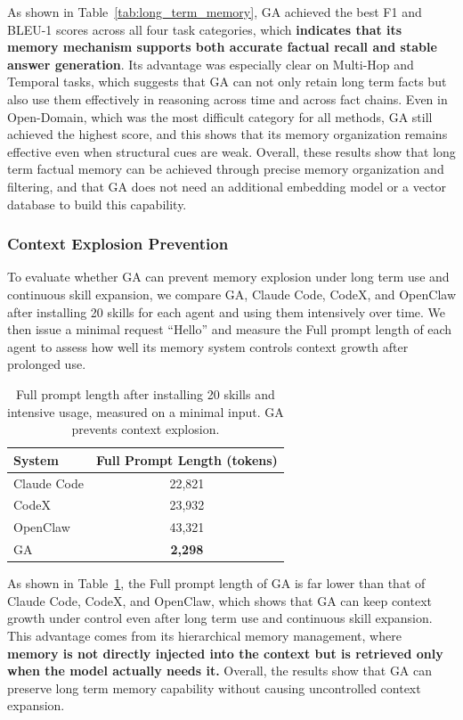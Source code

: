 As shown in Table~\ref{tab:long_term_memory}, GA achieved the best F1 and BLEU-1 scores across all four task categories, which \textbf{indicates that its memory mechanism supports both accurate factual recall and stable answer generation}. 
Its advantage was especially clear on Multi-Hop and Temporal tasks, which suggests that GA can not only retain long term facts but also use them effectively in reasoning across time and across fact chains. 
Even in Open-Domain, which was the most difficult category for all methods, GA still achieved the highest score, and this shows that its memory organization remains effective even when structural cues are weak. 
Overall, these results show that long term factual memory can be achieved through precise memory organization and filtering, and that GA does not need an additional embedding model or a vector database to build this capability.


\subsubsection{Context Explosion Prevention}
\label{sec:exp_context_explosion}
To evaluate whether GA can prevent memory explosion under long term use and continuous skill expansion, we compare GA, Claude Code, CodeX, and OpenClaw after installing 20 skills for each agent and using them intensively over time. 
We then issue a minimal request ``Hello'' and measure the Full prompt length of each agent to assess how well its memory system controls context growth after prolonged use.

\begin{table}[t]
\centering
\caption{Full prompt length after installing 20 skills and intensive usage, measured on a minimal input. GA prevents context explosion.}
\label{tab:context_explosion}
\begin{tabular}{lc}
\toprule
\textbf{System} & \textbf{Full Prompt Length (tokens)} \\
\midrule
Claude Code & 22,821 \\
CodeX & 23,932 \\
OpenClaw & 43,321 \\
GA & \textbf{2,298} \\
\bottomrule
\end{tabular}
\end{table}

As shown in Table~\ref{tab:context_explosion}, the Full prompt length of GA is far lower than that of Claude Code, CodeX, and OpenClaw, which shows that GA can keep context growth under control even after long term use and continuous skill expansion. 
This advantage comes from its hierarchical memory management, where \textbf{memory is not directly injected into the context but is retrieved only when the model actually needs it. }
Overall, the results show that GA can preserve long term memory capability without causing uncontrolled context expansion.

